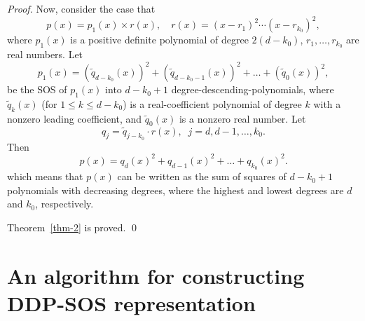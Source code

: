 \documentclass[runningheads]{llncs}
\begin{document}
\begin{proof}
Now, consider the case that 
$$
p(x)=p_1(x)\times r(x), \quad 
r(x)=(x-r_1)^2\cdots (x-r_{k_0})^2,
$$
where $p_1(x)$ is a positive definite polynomial of degree $2(d-k_0)$, $r_1,\ldots,r_{k_0}$ are real numbers.
Let
\[
p_1(x)=\left(\tilde{q}_{d-k_0}(x)\right)^2+\left(\tilde{q}_{d-k_0-1}(x)\right)^2+\ldots+\left(\tilde{q}_{0}(x)\right)^2,
\]
be the SOS of $p_1(x)$ into $d-k_0+1$ degree-descending-polynomials, 
where $\tilde{q}_{k}(x)$ (for $1\leq k\leq d-k_0$) is a real-coefficient polynomial of degree $k$ with a nonzero leading coefficient,  
and $\tilde{q}_{0}(x)$ is a nonzero real number. Let
$$
q_j=\tilde{q}_{j-k_0}\cdot r(x), \; \;
j=d,d-1,\ldots,k_0.
$$
Then
$$
p(x)=q_d(x)^2+q_{d-1}(x)^2+\ldots+
q_{k_0}(x)^2.
$$
which means that $p(x)$ can be written as the sum of squares of $d-k_0+1$ polynomials with decreasing degrees,  
where the highest and lowest degrees are $d$ and $k_0$, respectively.  

{Theorem~\ref{thm-2} is proved.}  
\qed  
    
\end{proof}  

\section{An algorithm for constructing DDP-SOS representation
}
\label{algorithm}
\end{document}
